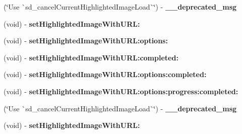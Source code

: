 \begin{DoxyCompactItemize}
(\char`\"{}Use \`{}sd\+\_\+cancel\+Current\+Highlighted\+Image\+Load\`{}\char`\"{}) -\/ {\bfseries \+\_\+\+\_\+deprecated\+\_\+msg}
\item 
\mbox{\label{category_u_i_image_view_07_highlighted_web_cache_deprecated_08_ac812fd81114de815a4238045acb43445}} 
(void) -\/ {\bfseries set\+Highlighted\+Image\+With\+U\+R\+L\+:}
\item 
\mbox{\label{category_u_i_image_view_07_highlighted_web_cache_deprecated_08_a2bd061c465ca398dd62daae24ebc86fc}} 
(void) -\/ {\bfseries set\+Highlighted\+Image\+With\+U\+R\+L\+:options\+:}
\item 
\mbox{\label{category_u_i_image_view_07_highlighted_web_cache_deprecated_08_a75c246067498b4528688fdc61d6989bd}} 
(void) -\/ {\bfseries set\+Highlighted\+Image\+With\+U\+R\+L\+:completed\+:}
\item 
\mbox{\label{category_u_i_image_view_07_highlighted_web_cache_deprecated_08_a501b2bd3725b08ca2dbb5b0c24ce15e4}} 
(void) -\/ {\bfseries set\+Highlighted\+Image\+With\+U\+R\+L\+:options\+:completed\+:}
\item 
\mbox{\label{category_u_i_image_view_07_highlighted_web_cache_deprecated_08_ab41175b78f491f6e13f912443618357c}} 
(void) -\/ {\bfseries set\+Highlighted\+Image\+With\+U\+R\+L\+:options\+:progress\+:completed\+:}
\item 
\mbox{\label{category_u_i_image_view_07_highlighted_web_cache_deprecated_08_afb53abd0302272b5f57ad21a8a5b8444}} 
(\char`\"{}Use \`{}sd\+\_\+cancel\+Current\+Highlighted\+Image\+Load\`{}\char`\"{}) -\/ {\bfseries \+\_\+\+\_\+deprecated\+\_\+msg}
\item 
\mbox{\label{category_u_i_image_view_07_highlighted_web_cache_deprecated_08_ac812fd81114de815a4238045acb43445}} 
(void) -\/ {\bfseries set\+Highlighted\+Image\+With\+U\+R\+L\+:}

\end{DoxyCompactItemize}
